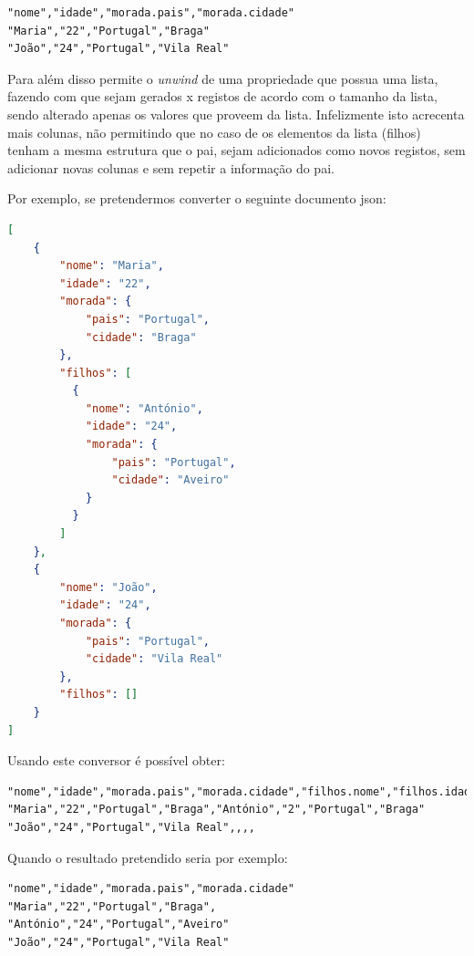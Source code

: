 \begin{lstlisting}[caption=Resultado da conversão do exemplo~\ref{exem:jsonBib} usando o conversor \texttt{json2csv}, label=exem:json2csv]
"nome","idade","morada.pais","morada.cidade"
"Maria","22","Portugal","Braga"
"João","24","Portugal","Vila Real"
\end{lstlisting}

Para além disso permite o \textit{unwind} de uma propriedade que possua uma lista, fazendo com que sejam gerados x registos de acordo com o tamanho da lista, sendo alterado apenas os valores que proveem da lista. Infelizmente isto acrecenta mais colunas, não permitindo que no caso de os elementos da lista (filhos) tenham a mesma estrutura que o pai, sejam adicionados como novos registos, sem adicionar novas colunas e sem repetir a informação do pai. 

Por exemplo, se pretendermos converter o seguinte documento \acrshort{json}:
\begin{lstlisting}[language=json, caption=Outro exemplo em \acrshort{json} a converter, label=exem:jsonBib2]
[
    {
        "nome": "Maria",
        "idade": "22",
        "morada": {
            "pais": "Portugal",
            "cidade": "Braga"
        },
        "filhos": [
          {
            "nome": "António",
            "idade": "24",
            "morada": {
                "pais": "Portugal",
                "cidade": "Aveiro"
            }
          }
        ]
    },
    {
        "nome": "João",
        "idade": "24",
        "morada": {
            "pais": "Portugal",
            "cidade": "Vila Real"
        },
        "filhos": []
    }
]
\end{lstlisting}

Usando este conversor é possível obter:
\begin{lstlisting}[caption=Resultado da conversão do exemplo~\ref{exem:jsonBib2} usando o conversor \texttt{json2csv}]
"nome","idade","morada.pais","morada.cidade","filhos.nome","filhos.idade","filhos.morada.pais","filhos.morada.cidade"
"Maria","22","Portugal","Braga","António","2","Portugal","Braga"
"João","24","Portugal","Vila Real",,,,
\end{lstlisting}

Quando o resultado pretendido seria por exemplo:
\begin{lstlisting}[caption=Resultado pretendido da conversão do exemplo~\ref{exem:jsonBib2}]
"nome","idade","morada.pais","morada.cidade"
"Maria","22","Portugal","Braga",
"António","24","Portugal","Aveiro"
"João","24","Portugal","Vila Real"
\end{lstlisting}

